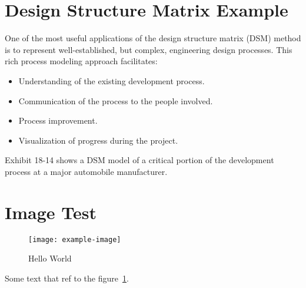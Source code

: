 
\begin{appendices}
  \section{Design Structure Matrix Example}
  One of the most useful applications of the design structure matrix (DSM) method is to represent well-established, but complex, engineering design processes. This rich process modeling approach facilitates:
  \begin{itemize}
    \item Understanding of the existing development process.
    \item Communication of the process to the people involved.
    \item Process improvement.
    \item Visualization of progress during the project.
  \end{itemize}

Exhibit 18-14 shows a DSM model of a critical portion of the development process at a major automobile manufacturer.

\section{Image Test}

\begin{figure}[htbp]
  \centering
  \texttt{[image: example-image]}
  \caption{Hello World}\label{fig:2}
\end{figure}

Some text that ref to the figure~\ref{fig:2}.

\end{appendices}
